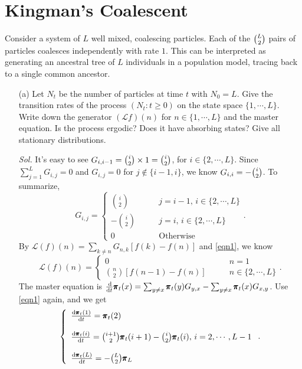 \section{Kingman's Coalescent}
Consider a system of $L$ well mixed, coalescing particles. Each of the $\tbinom{L}{2}$ pairs of particles coalesces independently with rate $1$. This can be interpreted as generating an ancestral tree of $L$ individuals in a population model, tracing back to a single common ancestor.
\begin{enumerate}
    \item[(a)] Let $N_t$ be the number of particles at time $t$ with $N_0 = L$. Give the transition rates of the process $(N_t : t \ge 0)$ on the state space $\{1,\cdots,L\}$. Write down the generator $(\mathcal{L}f)(n)$ for $n \in \{1, \cdots,L\}$ and the master equation. Is the process ergodic? Does it have absorbing states? Give all stationary distributions. 
     
    \textit{ Sol. }  It's easy to see $G_{i,i-1} = \tbinom{i}{2} \times 1 = \tbinom{i}{2}$, for $i \in \{2, \cdots, L\}$. Since $\sum_{j=1}^L G_{i,j} = 0$ and $G_{i,j} = 0$ for $j \notin \{i-1, i\}$, we know $G_{i,i} = - \tbinom{i}{2}$. To summarize,
    \begin{equation}\label{eqn1}
    G_{i,j} = \begin{cases}
        \binom{i}{2} \qquad & j = i - 1, \, i \in \{2, \cdots, L\} \\ 
        -\binom{i}{2} \qquad & j = i, \, i \in \{2, \cdots, L\} \\ 
        0 \qquad & \text{Otherwise}
    \end{cases}.
    \end{equation}
    By $\mathcal{L}(f)(n) = \sum_{k \neq n} G_{n, k} [f(k) - f(n)]$ and \eqref{eqn1}, we know 
    \begin{equation}
        \mathcal{L}(f)(n) = \begin{cases}
            0 \qquad & n = 1 \\ 
            \binom{n}{2}[f(n-1) -f(n)] \qquad & n \in \{2,\cdots, L\}
        \end{cases}.
    \end{equation}
    The master equation is $\frac{\dif}{\dif t} \mbf{\pi}_t(x) = \sum_{y \neq x}\mbf{\pi}_t(y) G_{y,x} - \sum_{y \neq x} \mbf{\pi}_t (x) G_{x,y}$. Use \eqref{eqn1} again, and we get
    \begin{equation}
        \left\{ 
        \begin{array}{l}
            \frac{\dif \mbf{\pi}_t(1)}{\dif t} = \mbf{\pi}_t(2) \\ 
              \\ 
            \frac{\dif \mbf{\pi}_t(i)}{\dif t} = \binom{i+1}{2} \mbf{\pi}_t(i+1) - \binom{i}{2} \mbf{\pi}_t(i),\, i = 2,\cdots,L-1\\ 
             \\ 
            \frac{\dif \mbf{\pi}_t(L)}{\dif t} = -\binom{L}{2} \mbf{\pi}_L
        \end{array}
        \right. 
        .
    \end{equation}


\end{enumerate}
